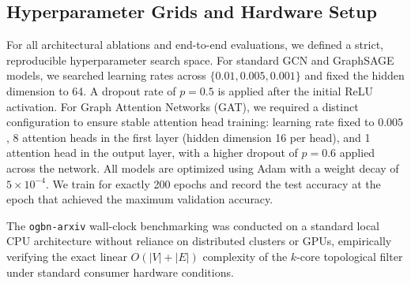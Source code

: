\documentclass[10pt]{article} %
\begin{document}
\subsection{Hyperparameter Grids and Hardware Setup}
For all architectural ablations and end-to-end evaluations, we defined a strict, reproducible hyperparameter search space. 
For standard GCN and GraphSAGE models, we searched learning rates across $\{0.01, 0.005, 0.001\}$ and fixed the hidden dimension to 64. A dropout rate of $p=0.5$ is applied after the initial ReLU activation. 
For Graph Attention Networks (GAT), we required a distinct configuration to ensure stable attention head training: learning rate fixed to $0.005$, 8 attention heads in the first layer (hidden dimension 16 per head), and 1 attention head in the output layer, with a higher dropout of $p=0.6$ applied across the network.
All models are optimized using Adam with a weight decay of $5 \times 10^{-4}$. We train for exactly 200 epochs and record the test accuracy at the epoch that achieved the maximum validation accuracy.

The \texttt{ogbn-arxiv} wall-clock benchmarking was conducted on a standard local CPU architecture without reliance on distributed clusters or GPUs, empirically verifying the exact linear $O(|V| + |E|)$ complexity of the $k$-core topological filter under standard consumer hardware conditions.
\end{document}
